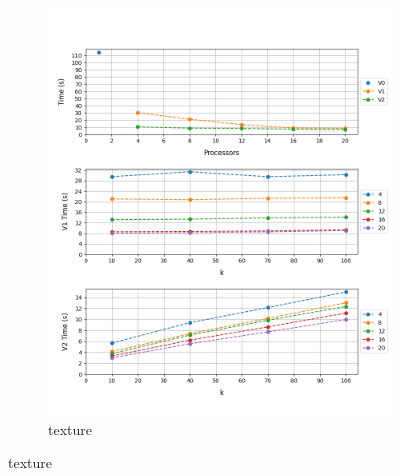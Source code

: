 \documentclass[12pt, a4paper]{article}
\begin{document}
\begin{figure}[h!]
\begin{subfigure}[b]{0.33\textwidth}
         \includegraphics[height=.4\textheight, width=\textwidth, keepaspectratio]{assets/corel/texture.png}
         \caption{texture} 
     \end{subfigure}
\end{figure}
\end{document}
